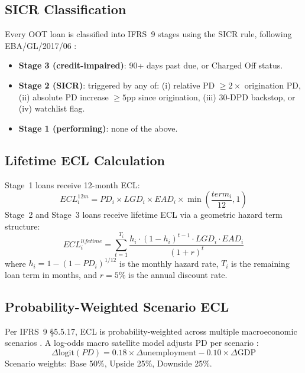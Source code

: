 \documentclass[12pt,a4paper]{report}
\begin{document}
\subsection{SICR Classification}

Every OOT loan is classified into IFRS~9 stages using the SICR rule, following EBA/GL/2017/06 \cite{eba2017b}:
\begin{itemize}
  \item \textbf{Stage 3 (credit-impaired)}: 90+ days past due, or Charged Off status.
  \item \textbf{Stage 2 (SICR)}: triggered by any of: (i) relative PD $\geq 2\times$ origination PD, (ii) absolute PD increase $\geq 5$pp since origination, (iii) 30-DPD backstop, or (iv) watchlist flag.
  \item \textbf{Stage 1 (performing)}: none of the above.
\end{itemize}

\subsection{Lifetime ECL Calculation}

Stage~1 loans receive 12-month ECL:
\begin{equation}
  ECL^{12m}_i = PD_i \times LGD_i \times EAD_i \times \min\!\left(\frac{term_i}{12}, 1\right)
\end{equation}
Stage~2 and Stage~3 loans receive lifetime ECL via a geometric hazard term structure:
\begin{equation}
  ECL^{lifetime}_i = \sum_{t=1}^{T_i} \frac{h_i \cdot (1-h_i)^{t-1} \cdot LGD_i \cdot EAD_i}{(1+r)^t}
\end{equation}
where $h_i = 1 - (1-PD_i)^{1/12}$ is the monthly hazard rate, $T_i$ is the remaining loan term in months, and $r = 5\%$ is the annual discount rate.

\subsection{Probability-Weighted Scenario ECL}

Per IFRS~9 \S5.5.17, ECL is probability-weighted across multiple macroeconomic scenarios \cite{iasb2014}. A log-odds macro satellite model adjusts PD per scenario \cite{bellotti2009}:
\begin{equation}
  \Delta \text{logit}(PD) = 0.18 \times \Delta\text{unemployment} - 0.10 \times \Delta\text{GDP}
\end{equation}
Scenario weights: Base 50\%, Upside 25\%, Downside 25\%.
\end{document}
